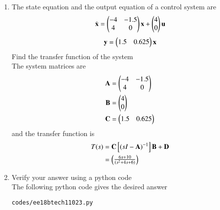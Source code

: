 \begin{enumerate}[label=\thesubsection.\arabic*.,ref=\thesubsection.\theenumi]

\item
The state equation and the output equation of a control system are 
\begin{align}
    \dot{\mathbf{ x}}=\begin{pmatrix}-4&-1.5\\4&0\end{pmatrix}\mathbf{x} + \begin{pmatrix}4\\0\end{pmatrix}\mathbf{u}   
\end{align}
\begin{align}
    \mathbf{y} = \begin{pmatrix}1.5&0.625\end{pmatrix}\mathbf{x}
\end{align}
%  
Find the transfer function of the system 
\\
\solution The system matrices are
\begin{align}
    \mathbf{A} &= \begin{pmatrix}-4&-1.5\\4&0\end{pmatrix}
\\
    \mathbf{B} &= \begin{pmatrix}4\\0\end{pmatrix}
\\
     \mathbf{C} &= \begin{pmatrix}1.5&0.625\end{pmatrix}
\end{align}
and  the  transfer  function is
%
\begin{align}
    T(s) &= \mathbf{C}{}\left[(sI-\mathbf{A})^{-1}\right]\mathbf{B} + \mathbf{D}
\\
 &  = \begin{pmatrix}\frac{6s+10}{(s^2 + 4s + 6)}\end{pmatrix} 
\end{align}
\item  Verify your  answer using a python code
\\
\solution The following python code gives the desired answer
\begin{lstlisting}
codes/ee18btech11023.py
\end{lstlisting}
\end{enumerate}
